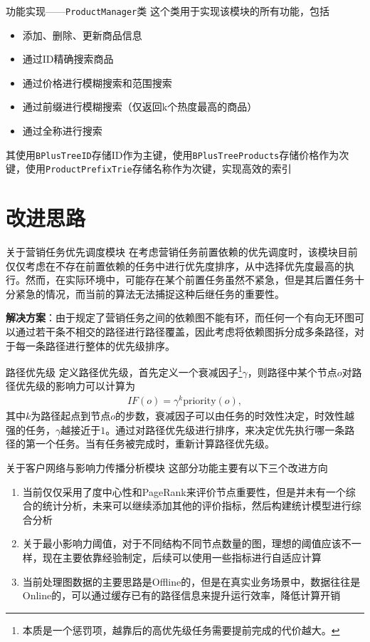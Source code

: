 \documentclass[aspectratio=169]{beamer}
\begin{document}
\begin{frame}{功能实现——\texttt{ProductManager}类}
    这个类用于实现该模块的所有功能，包括
    \begin{itemize}
        \item 添加、删除、更新商品信息
        \item 通过ID精确搜索商品
        \item 通过价格进行模糊搜索和范围搜索
        \item 通过前缀进行模糊搜索（仅返回k个热度最高的商品）
        \item 通过全称进行搜索
    \end{itemize}
    其使用\texttt{BPlusTreeID}存储ID作为主键，使用\texttt{BPlusTreeProducts}存储价格作为次键，使用\texttt{ProductPrefixTrie}存储名称作为次键，实现高效的索引
\end{frame}

\section{改进思路}
\begin{frame}{关于营销任务优先调度模块}
    在考虑营销任务前置依赖的优先调度时，该模块目前仅仅考虑在不存在前置依赖的任务中进行优先度排序，从中选择优先度最高的执行。然而，在实际环境中，可能存在某个前置任务虽然不紧急，但是其后置任务十分紧急的情况，而当前的算法无法捕捉这种后继任务的重要性。

    \textbf{解决方案}：由于规定了营销任务之间的依赖图不能有环，而任何一个有向无环图可以通过若干条不相交的路径进行路径覆盖，因此考虑将依赖图拆分成多条路径，对于每一条路径进行整体的优先级排序。
\end{frame}

\begin{frame}{路径优先级}
    定义路径优先级，首先定义一个衰减因子\footnote{本质是一个惩罚项，越靠后的高优先级任务需要提前完成的代价越大。}$\gamma$，则路径中某个节点$o$对路径优先级的影响力可以计算为
    \begin{align*}
        IF(o) = \gamma^k \text{priority}(o),
    \end{align*}
    其中$k$为路径起点到节点$o$的步数，衰减因子可以由任务的时效性决定，时效性越强的任务，$\gamma$越接近于$1$。通过对路径优先级进行排序，来决定优先执行哪一条路径的第一个任务。当有任务被完成时，重新计算路径优先级。
\end{frame}

\begin{frame}{关于客户网络与影响力传播分析模块}
    这部分功能主要有以下三个改进方向
    \begin{enumerate}
        \item 当前仅仅采用了度中心性和PageRank来评价节点重要性，但是并未有一个综合的统计分析，未来可以继续添加其他的评价指标，然后构建统计模型进行综合分析
        \item 关于最小影响力阈值，对于不同结构不同节点数量的图，理想的阈值应该不一样，现在主要依靠经验制定，后续可以使用一些指标进行自适应计算
        \item 当前处理图数据的主要思路是Offline的，但是在真实业务场景中，数据往往是Online的，可以通过缓存已有的路径信息来提升运行效率，降低计算开销
    \end{enumerate}
\end{frame}
\end{document}
